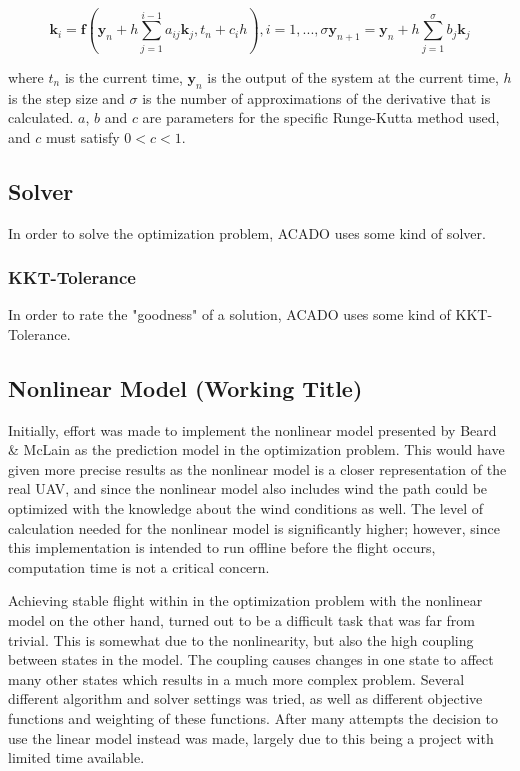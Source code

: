\begin{subequations}
\begin{equation}
	\mathbf{k}_i = \mathbf{f}(\mathbf{y}_n + h \sum_{j=1}^{i-1} a_{ij}\mathbf{k}_j, t_n + c_ih), i = 1, ..., \sigma
\end{equation}
\begin{equation}
	\mathbf{y}_{n+1} = \mathbf{y}_n + h \sum_{j=1}^\sigma b_j \mathbf{k}_j
\end{equation}
\end{subequations}

where $t_n$ is the current time, $\mathbf{y}_n$ is the output of the system at the current time, $h$ is the step size and $\sigma$ is the number of approximations of the derivative that is calculated. $a$, $b$ and $c$ are parameters for the specific Runge-Kutta method used, and $c$ must satisfy $0 < c < 1$.

\subsection{Solver}

In order to solve the optimization problem, ACADO uses some kind of solver.

\subsubsection{KKT-Tolerance}

In order to rate the "goodness" of a solution, ACADO uses some kind of KKT-Tolerance.


\subsection{Nonlinear Model (Working Title)}

Initially, effort was made to implement the nonlinear model presented by Beard \& McLain \cite{uavBEARD} as the prediction model in the optimization problem. This would have given more precise results as the nonlinear model is a closer representation of the real UAV, and since the nonlinear model also includes wind the path could be optimized with the knowledge about the wind conditions as well. The level of calculation needed for the nonlinear model is significantly higher; however, since this implementation is intended to run offline before the flight occurs, computation time is not a critical concern.

Achieving stable flight within in the optimization problem with the nonlinear model on the other hand, turned out to be a difficult task that was far from trivial. This is somewhat due to the nonlinearity, but also the high coupling between states in the model. The coupling causes changes in one state to affect many other states which results in a much more complex problem. Several different algorithm and solver settings was tried, as well as different objective functions and weighting of these functions. After many attempts the decision to use the linear model instead was made, largely due to this being a project with limited time available.